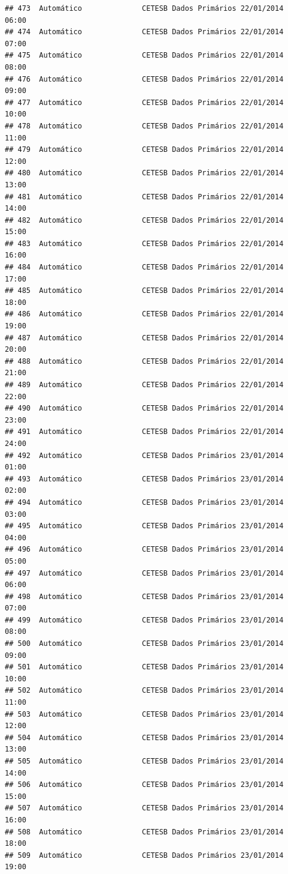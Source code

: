 \documentclass[]{book}
\begin{document}
\begin{verbatim}
## 473  Automático              CETESB Dados Primários 22/01/2014 06:00
## 474  Automático              CETESB Dados Primários 22/01/2014 07:00
## 475  Automático              CETESB Dados Primários 22/01/2014 08:00
## 476  Automático              CETESB Dados Primários 22/01/2014 09:00
## 477  Automático              CETESB Dados Primários 22/01/2014 10:00
## 478  Automático              CETESB Dados Primários 22/01/2014 11:00
## 479  Automático              CETESB Dados Primários 22/01/2014 12:00
## 480  Automático              CETESB Dados Primários 22/01/2014 13:00
## 481  Automático              CETESB Dados Primários 22/01/2014 14:00
## 482  Automático              CETESB Dados Primários 22/01/2014 15:00
## 483  Automático              CETESB Dados Primários 22/01/2014 16:00
## 484  Automático              CETESB Dados Primários 22/01/2014 17:00
## 485  Automático              CETESB Dados Primários 22/01/2014 18:00
## 486  Automático              CETESB Dados Primários 22/01/2014 19:00
## 487  Automático              CETESB Dados Primários 22/01/2014 20:00
## 488  Automático              CETESB Dados Primários 22/01/2014 21:00
## 489  Automático              CETESB Dados Primários 22/01/2014 22:00
## 490  Automático              CETESB Dados Primários 22/01/2014 23:00
## 491  Automático              CETESB Dados Primários 22/01/2014 24:00
## 492  Automático              CETESB Dados Primários 23/01/2014 01:00
## 493  Automático              CETESB Dados Primários 23/01/2014 02:00
## 494  Automático              CETESB Dados Primários 23/01/2014 03:00
## 495  Automático              CETESB Dados Primários 23/01/2014 04:00
## 496  Automático              CETESB Dados Primários 23/01/2014 05:00
## 497  Automático              CETESB Dados Primários 23/01/2014 06:00
## 498  Automático              CETESB Dados Primários 23/01/2014 07:00
## 499  Automático              CETESB Dados Primários 23/01/2014 08:00
## 500  Automático              CETESB Dados Primários 23/01/2014 09:00
## 501  Automático              CETESB Dados Primários 23/01/2014 10:00
## 502  Automático              CETESB Dados Primários 23/01/2014 11:00
## 503  Automático              CETESB Dados Primários 23/01/2014 12:00
## 504  Automático              CETESB Dados Primários 23/01/2014 13:00
## 505  Automático              CETESB Dados Primários 23/01/2014 14:00
## 506  Automático              CETESB Dados Primários 23/01/2014 15:00
## 507  Automático              CETESB Dados Primários 23/01/2014 16:00
## 508  Automático              CETESB Dados Primários 23/01/2014 18:00
## 509  Automático              CETESB Dados Primários 23/01/2014 19:00

\end{verbatim}
\end{document}
